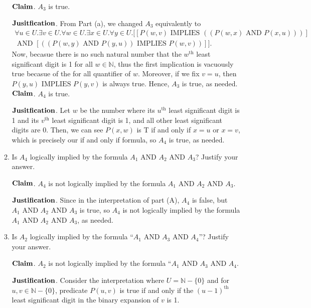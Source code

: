 \documentclass[11pt]{article}
\newcommand{\aand}{\,\,\mathrm{AND}\,\,}
\newcommand{\iimplies}{\,\,\mathrm{IMPLIES}\,\,}
\newcommand{\nats}{\mathbb{N}}
\begin{document}
\begin{enumerate}
\begin{enumerate}
$\bold{Claim}$. $A_3$ is true.

$\bold{Jusitfication}$. From Part (a), we changed $A_3$ equivalently to \begin{multline*}
    \forall u\in U. \exists v\in U. \forall w\in U. \exists x\in U. \forall y\in U. [[P(w,v)\iimplies ((P(w,x)\aand P(x,u)))]\\\aand [((P(w,y) \aand P(y,u))\iimplies P(w,v))]]. 
\end{multline*} Now, becasue there is no such natural number that the $w^{\text{th}}$ least significant digit is 1 for all $w\in\nats$, thus the first implication is vacuously true becasue of the for all quantifier of $w$. Moreover, if we fix $v=u$, then $P(y,u)\iimplies P(y,v)$ is always true. Hence, $A_3$ is true, as needed.\\ 

$\bold{Claim}$. $A_4$ is true. 

$\bold{Jusitfication}$. Let $w$ be the number where its $u^{\text{th}}$ least significant digit is 1 and its $v^{\text{th}}$ least significant digit is 1, and all other least significant digits are 0. Then, we can see $P(x,w)$ is T if and only if $x=u$ or $x=v$, which is precisely our if and only if formula, so $A_4$ is true, as needed.\\

\item Is $A_4$ logically implied by the formula $A_1 \mbox{ AND } A_2\mbox{ AND }A_3$? Justify your answer.

$\bold{Claim}$. $A_4$ is not logically implied by the formula $A_1 \mbox{ AND } A_2\mbox{ AND }A_3$.

$\bold{Justification}$. Since in the interpretation of part (A), $A_4$ is false, but $A_1 \mbox{ AND } A_2\mbox{ AND }A_3$ is true, so $A_4$ is not logically implied by the formula $A_1 \mbox{ AND } A_2\mbox{ AND }A_3$, as needed.\\

\item Is $A_2$ logically implied by the formula ``$A_1 \mbox{ AND } A_3\mbox{ AND }A_4$''? Justify your answer. 

$\bold{Claim}$. $A_2$ is not logically implied by the formula ``$A_1 \mbox{ AND } A_3\mbox{ AND }A_4$.

$\bold{Justification}$. Consider the interpretation where $U=\nats-\{0\}$ and for $u,v\in\nats-\{0\}$, predicate $P(u,v)$ is true if and only if the $(u-1)^{\text{th}}$ least significant digit in the binary expansion of $v$ is 1.


\end{enumerate}
\end{enumerate}
\end{document}
